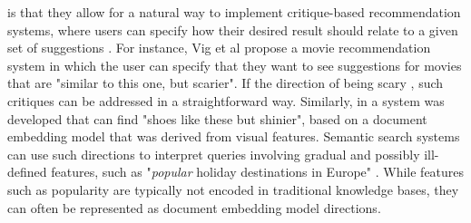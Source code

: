   is  that they allow for a natural way to implement critique-based recommendation systems, where users can specify how their desired result should relate to a given set of suggestions \cite{Viappiani2006}. For instance, Vig et al \cite{Vig2014} propose a movie recommendation system in which the user can specify that they want to see suggestions for movies that are "similar to this one, but scarier". If the direction of being scary , such critiques can be addressed in a straightforward way. Similarly, in \cite{Kovashka} a system was developed that can find "shoes like these but shinier", based on a document embedding model that was derived from visual features. Semantic search systems can use such directions to interpret queries involving gradual and possibly ill-defined features, such as "\emph{popular} holiday destinations in Europe" \cite{Jameel}. While features such as popularity are typically not encoded in traditional knowledge bases, they can often be represented as document embedding model directions.%








